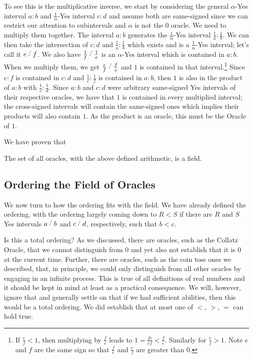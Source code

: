 \documentclass[12pt]{article}
\begin{document}
\begin{itemize}
    To see this is the multiplicative inverse, we start by considering the general $\alpha$-Yes interval $a:b$ and $\frac{1}{\alpha}$-Yes interval $c:d$ and assume both are same-signed since we can restrict our attention to subintervals and $\alpha$ is not the 0 oracle. We need to multiply them together. The interval $a:b$ generates the $\frac{1}{\alpha}$-Yes interval $\frac{1}{a}:\frac{1}{b}$. We can then take the intersection of $c:d$ and $\frac{1}{a}:\frac{1}{b}$ which exists and is a $\frac{1}{\alpha}$-Yes interval; let's call it $e\lte f$. We also have $\frac{1}{f} \lte \frac{1}{e}$ is an $\alpha$-Yes interval which is contained in $a:b$. When we multiply them, we get $\frac{e}{f}\lte \frac{f}{e}$ and $1$ is  contained in that interval.\footnote{If $\frac{e}{f} <1$, then multiplying by $\frac{f}{e}$ leads to $1 = \frac{fe}{ef} < \frac{f}{e}$. Similarly for $\frac{e}{f} > 1$. Note $e$ and $f$ are the same sign so that $\frac{f}{e}$ and $\frac{e}{f}$ are greater than 0. } Since $e:f$ is contained in $c:d$ and $\frac{1}{e}:\frac{1}{f}$ is contained in $a:b$, then $1$ is also in the product of $a:b$ with $\frac{1}{c}:\frac{1}{d}$. Since $a:b$ and $c:d$ were arbitrary same-signed Yes intervals of their respective oracles, we have that $1$ is contained in every multiplied interval; the cross-signed intervals will contain the same-signed ones which implies their products will also contain $1$. As the product is an oracle, this must be the Oracle of $1$. 
    
\end{itemize}

We have proven that

\begin{theorem}
The set of all oracles, with the above defined arithmetic, is a field. 
\end{theorem}

\subsection{Ordering the Field of Oracles}

We now turn to how the ordering fits with the field. We have already defined the ordering, with the ordering largely coming down to $R < S$ if there are $R$ and $S$ Yes intervals $a\lte b$ and $c\lte d$, respectively, such that $b<c$. 

Is this a total ordering? As we discussed, there are oracles, such as the Collatz Oracle, that we cannot distinguish from 0 and yet also not establish that it is 0 at the current time. Further, there are oracles, such as the coin toss ones we described, that, in principle, we could only distinguish from all other oracles by engaging in an infinite process. This is true of all definitions of real numbers and it should be kept in mind at least as a practical consequence. We will, however, ignore that and generally settle on that if we had sufficient abilities, then this would be a total ordering. We did establish that at most one of $<$, $>$, $=$ can hold true. 
\end{document}
